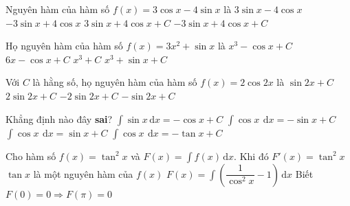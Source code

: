 \begin{ex}%
	Nguyên  hàm của hàm số $f(x)=3\cos x-4\sin x$ là
	 \choice
		{$3\sin x-4\cos x$} 
		{$-3\sin x+4\cos x$} 
		 {\True $3\sin x+4\cos x+C$}
		{$-3\sin  x+4\cos x+C$}
\end{ex}

\begin{ex}%
	 Họ nguyên hàm của hàm số $f(x)=3x^2+\sin x$ là
	 \choice
		 {\True $x^3-\cos x+C$}
		{$6x-\cos x+C$} 
		{$x^3+C$} 
		{$x^3+\sin  x+C$}
\end{ex}

\begin{ex}%
	Với $C$ là hằng số, họ nguyên hàm của hàm số $f(x)=2\cos 2x$ là 
	 \choice
		 {\True $\sin 2x+C$}
		 {$2\sin 2x+C$}
		{$-2\sin  2x+C$}
		 {$-\sin 2x+C$}
\end{ex}

\begin{ex}%
	Khẳng định nào  đây \textbf{sai}?
	 \choice
		{$\displaystyle \int \sin x  \mathrm{\,d}x=-\cos x+C$}
		{\True $\displaystyle \int \cos x ~\mathrm{\,d}x=-\sin  x+C$}
		{$\displaystyle  \int \cos x ~\mathrm{\,d}x=\sin x+C$}
		{$\displaystyle  \int \cos x ~\mathrm{\,d}x=-\tan x+C$}
\end{ex}



\begin{ex}%
	 Cho hàm số $f(x)=\tan^2x$ và $\displaystyle F(x)=\int f(x)\mathrm{\,d}x$. Khi đó
	 \choiceTF
		{\True $F'(x)=\tan^2x$} 
		 {$\tan x$ là một nguyên hàm của $f(x)$}
		{\True $\displaystyle F(x)=\int  \left(\dfrac{1}{\cos^2x}-1\right)\mathrm{\,d}x$}
		{Biết $F(0)=0\Rightarrow  F(\pi)=0$}
\end{ex}

